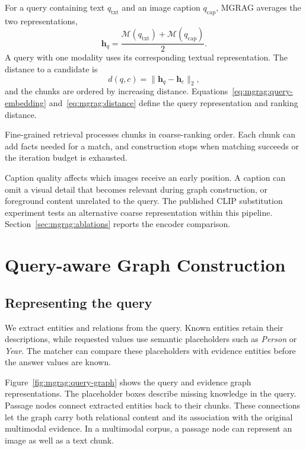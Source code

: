 For a query containing text $q_{\mathrm{txt}}$ and an image caption $q_{\mathrm{cap}}$, MGRAG averages the two representations,
\begin{equation}
\mathbf h_q=\frac{\mathcal M(q_{\mathrm{txt}})+\mathcal M(q_{\mathrm{cap}})}{2}.
\label{eq:mgrag:query-embedding}
\end{equation}
A query with one modality uses its corresponding textual representation. The distance to a candidate is
\begin{equation}
 d(q,c)=\lVert\mathbf h_q-\mathbf h_c\rVert_2,
\label{eq:mgrag:distance}
\end{equation}
and the chunks are ordered by increasing distance. Equations~\ref{eq:mgrag:query-embedding} and~\ref{eq:mgrag:distance} define the query representation and ranking distance.

Fine-grained retrieval processes chunks in coarse-ranking order. Each chunk can add facts needed for a match, and construction stops when matching succeeds or the iteration budget is exhausted.

Caption quality affects which images receive an early position. A caption can omit a visual detail that becomes relevant during graph construction, or foreground content unrelated to the query. The published CLIP substitution experiment tests an alternative coarse representation within this pipeline. Section~\ref{sec:mgrag:ablations} reports the encoder comparison.

\section{Query-aware Graph Construction}
\label{sec:mgrag:construction}

\subsection{Representing the query}

We extract entities and relations from the query. Known entities retain their descriptions, while requested values use semantic placeholders such as \emph{Person} or \emph{Year}. The matcher can compare these placeholders with evidence entities before the answer values are known.

Figure~\ref{fig:mgrag:query-graph} shows the query and evidence graph representations. The placeholder boxes describe missing knowledge in the query. Passage nodes connect extracted entities back to their chunks. These connections let the graph carry both relational content and its association with the original multimodal evidence. In a multimodal corpus, a passage node can represent an image as well as a text chunk.

